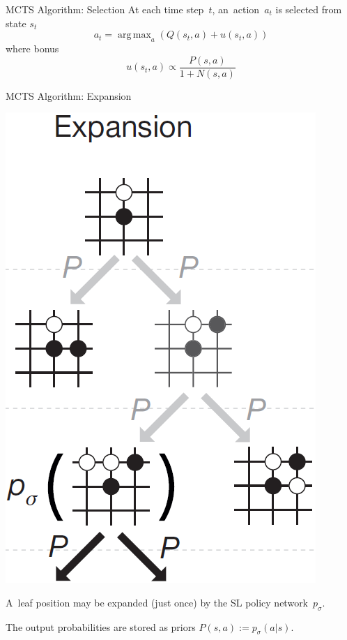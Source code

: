 \documentclass{beamer}
\DeclareMathOperator*{\argmax}{arg\,max}
\begin{document}
{\begin{frame}{MCTS Algorithm: Selection}
      \tiny
      At each time step~$t$, an~action~$a_t$ is selected from state $s_t$
      \[
        a_t = \argmax _a ( Q(s_t, a) + u(s_t, a) )
      \]
      \pause
      where bonus
      \[
        u(s_t, a) \propto \frac{P(s,a)}{1 + N(s,a)}
      \]
    \end{frame}

    \begin{frame}{MCTS Algorithm: Expansion}
      \begin{center}
        \includegraphics[height=.6\textheight]{../img/MCTS_expansion.png}
      \end{center}
      \pause

      \tiny
      A~leaf position may be expanded (just once) by the SL policy network~$p_\sigma$.
      \pause

      The output probabilities are stored as priors $P(s,a) := p_\sigma (a|s)$.
    \end{frame}

}
\end{document}
